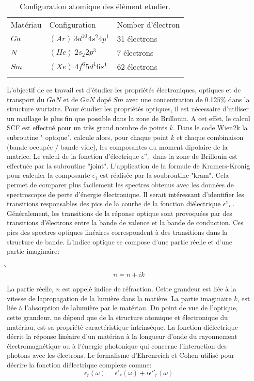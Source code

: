 \begin{table}
	\centering
	\begin{tabular}{lll}
		\hline\noalign{\smallskip}
		Matériau & Configuration & Nomber d'électron  \\
		\noalign{\smallskip}\hline\noalign{\smallskip}
		$ Ga $&  $ (Ar)~ 3d^{10}4s^{2}4p^{1} $& 31 électrons\\
		$ N  $&  $ (He)~ 2s_{2}2p^{3} $ & 7 électrons\\
		$ Sm $&  $ (Xe)~ 4f^{6}5d^{1}6s^{1} $ & 62 électrons\\
		\noalign{\smallskip}\hline
	\end{tabular}
	\caption{Configuration atomique des élément etudier.}
	\label{tab:Configuration}     
\end{table} 
L'objectif de ce travail est d'étudier les propriétés électroniques, optiques et de transport du $ GaN $ et de $ GaN $ dopé $ Sm $ avec une concentration de 0.125\% dans la structure wurtzite. Pour étudier les propriétés optiques, il est nécessaire d'utiliser un maillage le plus fin que possible dans la zone de Brillouin. A cet effet, le calcul SCF est effectué pour un très grand nombre de points $ k $. Dans le code Wien2k la subroutine " optique", calcule alors, pour chaque point $ k $ et chaque combinaison (bande occupée / bande vide), les composantes du moment dipolaire de la matrice. Le calcul de la fonction d'électrique $ \epsilon"_{r} $ dans la zone de Brillouin est effectuée par la  subroutine "joint". L'application de la formule de Kramers-Kronig pour calculer la composante $ \epsilon_{1} $ est réalisée par la soubroutine "kram". Cela permet de comparer plus facilement les spectres obtenus avec les données de spectroscopie de perte d'énergie électronique. Il serait intéressant d'identifier les transitions responsables des pics de la courbe de la fonction diélectrique $ \epsilon"_{r} $. Généralement, les transitions de la réponse optique sont provoquées par des transitions d'électrons entre la bande de valence et la bande de conduction. Ces pics des spectres optiques linéaires correspondent à des transitions dans la structure de bande. L’indice optique se compose d'une partie réelle et d'une partie imaginaire:

̃\begin{equation}\label{1}
	n=n+ik
\end{equation} 

La partie réelle, $ n $ est appelé indice de réfraction. Cette grandeur est liée à la vitesse de lapropagation de la lumière dans la matière. La partie imaginaire $ k $, est liée à l’absorption de lalumière par le matériau. Du point de vue de l’optique, cette grandeur, ne dépend que de la structure atomique et électronique du matériau, est sa propriété caractéristique intrinsèque. La fonction diélectrique décrit la réponse linéaire d'un matériau à la longueur d'onde du rayonnement électromagnétique ou à l'énergie photonique qui concerne l'interaction des photons avec les électrons. Le formalisme d'Ehrenreich et Cohen utilisé pour décrire la fonction diélectrique complexe comme:
\begin{equation}\label{2}
	\epsilon_{r}(\omega)= \epsilon'_{r}(\omega)+i\epsilon''_{r}(\omega)
\end{equation}


